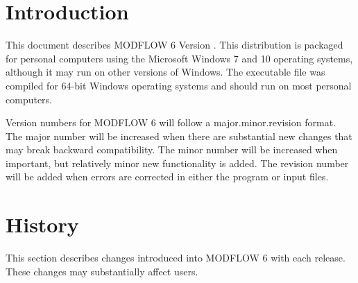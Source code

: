 \documentclass[11pt,twoside,twocolumn]{usgsreport}
\begin{document}
\ifdef{\makefrontcoveralt}{\makefrontcoveralt}{\makefrontcover}

\ifdef{\makefrontmatterabv}{\makefrontmatterabv}{\makefrontmatter}

\onecolumn
\pagestyle{body}
\RaggedRight
{}
\pagestyle{body}
\setlength{\parindent}{1.5pc}

\section{Introduction}
This document describes MODFLOW 6 Version \modflowversion.  This distribution is packaged for personal computers using the Microsoft Windows 7 and 10 operating systems, although it may run on other versions of Windows.  The executable file was compiled for 64-bit Windows operating systems and should run on most personal computers.

Version numbers for MODFLOW 6 will follow a major.minor.revision format.  The major number will be increased when there are substantial new changes that may break backward compatibility.  The minor number will be increased when important, but relatively minor new functionality is added.  The revision number will be added when errors are corrected in either the program or input files.

\section{History}
This section describes changes introduced into MODFLOW 6 with each release.  These changes may substantially affect users.
\end{document}

